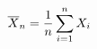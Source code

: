\documentclass[preview]{standalone}
\begin{document}
\begin{align*}
\special{dvisvgm:raw <g id='unique000'>}\overline X_n=\frac{1}{n}\sum_{i=1}^n X_i\special{dvisvgm:raw </g>}
\end{align*}
\end{document}
